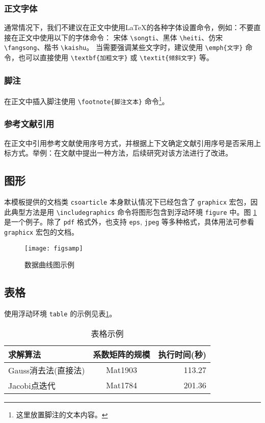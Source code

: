 \documentclass[UTF8]{csoarticle}
\begin{document}
\subsubsection{正文字体}

通常情况下，我们不建议在正文中使用\LaTeX{}的各种字体设置命令，例如：不要直接在正文中使用以下的字体命令：
宋体 \verb|\songti|、黑体 \verb|\heiti|、仿宋 \verb|\fangsong|、楷书 \verb|\kaishu|。
当需要强调某些文字时，建议使用 \verb|\emph{文字}| 命令，也可以直接使用 \verb|\textbf{加粗文字}| 或 \verb|\textit{倾斜文字}| 等。

\subsubsection{脚注}

在正文中插入脚注使用 \verb|\footnote{脚注文本}| 命令\footnote{这里放置脚注的文本内容。}。

\subsubsection{参考文献引用}

在正文中引用参考文献使用序号方式，并根据上下文确定文献引用序号是否采用上标方式。举例：在文献\cite{bib1}中提出一种方法，后续研究对该方法进行了改进。

\subsection{图形}

本模板提供的文档类 \verb|csoarticle| 本身默认情况下已经包含了 \verb|graphicx| 宏包，因此典型方法是用 \verb|\includegraphics| 命令将图形包含到浮动环境 \verb|figure| 中。图 \ref{fig:sample} 是一个例子。除了 \verb|pdf| 格式外，也支持 \verb|eps|, \verb|jpeg| 等多种格式，具体用法可参看 \verb|graphicx| 宏包的文档。
\begin{figure}
\centering\texttt{[image: figsamp]}
\caption{数据曲线图示例}
\label{fig:sample}
\end{figure}

\subsection{表格}

使用浮动环境 \verb|table| 的示例见表\ref{tab:sample}。
\begin{table}
  \caption{表格示例}
  \label{tab:sample}
  \centering
  \begin{tabular}{lcr}%
    \hline
    求解算法                & 系数矩阵的规模    & 执行时间(秒)  \\
    \hline
    Gauss消去法(直接法)     & Mat1903           &  113.27       \\
    Jacobi点迭代            & Mat1784           &  201.36       \\
    \hline
  \end{tabular}
\end{table}
\end{document}
